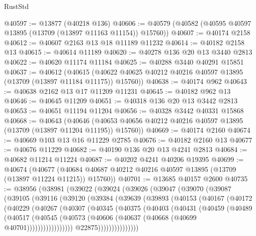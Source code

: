 \begin{lexlean}{RustStd}
\begin{coremodule}
@40597 := @13877 (@40218 @136)
@40606 := @40579 (@40582 (@40595 @40597 @13895 (@13709 (@13897 @11163 @11154)) @15760))
@40607 := @40174 @2158
@40612 := @40607 @2163 @13 @18 @11189 @11232
@40614 := @40182 @2158 @13
@40615 := @40614 @11189
@40620 := @40278 @136 @20 @13 @3440 @2813
@40622 := @40620 @11174 @11184
@40625 := @40288 @3440 @40291 @15851
@40637 := @40612
    (@40615 (@40622 @40625 @40212 @40216 @40597 @13895 (@13709 (@13897 @11184 @11175)) @15760))
@40638 := @40174 @962
@40643 := @40638 @2162 @13 @17 @11209 @11231
@40645 := @40182 @962 @13
@40646 := @40645 @11209
@40651 := @40318 @136 @20 @13 @3442 @2813
@40653 := @40651 @11194 @11204
@40656 := @40328 @3442 @40331 @15868
@40668 := @40643
    (@40646 (@40653 @40656 @40212 @40216 @40597 @13895 (@13709 (@13897 @11204 @11195)) @15760))
@40669 := @40174 @2160
@40674 := @40669 @103 @13 @16 @11229 @2785
@40676 := @40182 @2160 @13
@40677 := @40676 @11229
@40682 := @40190 @136 @20 @13 @4241 @2813
@40684 := @40682 @11214 @11224
@40687 := @40202 @4241 @40206 @19395
@40699 := @40674
    (@40677 (@40684 @40687 @40212 @40216 @40597 @13895 (@13709 (@13897 @11224 @11215)) @15760))
@40701 := @13685 @40157 @2600
@40735 := @38956
    (@38981
      (@39022
        (@39024
          (@39026
            (@39047
              (@39070
                (@39087
                  (@39105
                    (@39116
                      (@39120
                        (@39384
                          (@39639
                            (@39893
                              (@40153
                                (@40167
                                  (@40172
                                    (@40229
                                      (@40267
                                        (@40307
                                          (@40345
                                            (@40375
                                              (@40403
                                                (@40431
                                                  (@40459
                                                    (@40489
                                                      (@40517
                                                        (@40545
                                                          (@40573
                                                            (@40606
                                                              (@40637
                                                                (@40668
                                                                  (@40699 @40701)))))))))))))))))
                                  @22875)))))))))))))))

\end{coremodule}
\end{lexlean}
